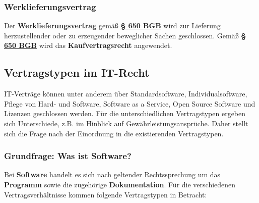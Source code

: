 \documentclass[12pt,A4]{extarticle}
\newcommand{\highlight}[1]{\textcolor{highlightColor}{\textbf{#1}}}
\newcommand{\bgb}[2][]{\textbf{\textcolor{gesetzLink}{\href{https://www.gesetze-im-internet.de/bgb/__#2.html}{§ #2 \ifthenelse{\equal{#1}{}}{}{#1 }BGB}}}}
\begin{document}
\subsubsection{Werklieferungsvertrag}
Der \highlight{Werklieferungsvertrag} gemäß \bgb{650} wird zur Lieferung herzustellender oder zu erzeugender beweglicher Sachen geschlossen. Gemäß \bgb[Abs. 1]{650} wird das \textbf{Kaufvertragsrecht} angewendet.

\subsection{Vertragstypen im IT-Recht}
IT-Verträge können unter anderem über Standardsoftware, Individualsoftware, Pflege von Hard- und Software, Software as a Service, Open Source Software und Lizenzen geschlossen werden.
Für die unterschiedlichen Vertragstypen ergeben sich Unterschiede, z.B. im Hinblick auf Gewährleistungsansprüche. Daher stellt sich die Frage nach der Einordnung in die existierenden Vertragstypen.

\subsubsection{Grundfrage: Was ist Software?}
Bei \highlight{Software} handelt es sich nach geltender Rechtssprechung um das \textbf{Programm} sowie die zugehörige \textbf{Dokumentation}.
Für die verschiedenen Vertragsverhältnisse kommen folgende Vertragstypen in Betracht:
\end{document}
